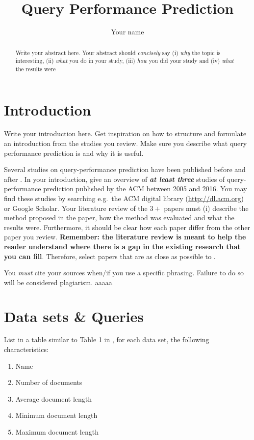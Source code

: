 \documentclass{sig-alternate}
\begin{document}
\title{Query Performance Prediction}
\author{
\alignauthor 
Your name
}
\maketitle

\begin{abstract}
Write your abstract here. Your abstract should \emph{concisely} say (i) \emph{why} the topic is interesting, (ii) \emph{what} you do in your study, (iii) \emph{how} you did your study and (iv) \emph{what} the results were
\end{abstract}

\section{Introduction}
Write your introduction here. Get inspiration on how to structure and formulate an introduction from the studies you review. Make sure you describe what query performance prediction is and why it is useful.

Several studies on query-performance prediction have been published before and after \cite{cummins2011improved}. In your introduction, give an overview of \textbf{\emph{at least three}} studies of query-performance prediction published by the ACM between 2005 and 2016. You may find these studies by searching e.g.\ the ACM digital library (\url{http://dl.acm.org}) or Google Scholar. Your literature review of the $3+$ papers must (i) describe the method proposed in the paper, how the method was evaluated and what the results were. Furthermore, it should be clear how each paper differ from the other paper you review. \textbf{Remember: the literature review is meant to help the reader understand where there is a gap in the existing research that you can fill}. Therefore, select papers that are as close as possible to \cite{cummins2011improved}. 

You \emph{must} cite your sources when/if you use a specific phrasing. Failure to do so will be considered plagiarism.
aaaaa
\section{Data sets \& Queries}
List in a table similar to Table 1 in \cite{cummins2011improved}, for each data set, the following characteristics:
\begin{enumerate}
\item Name
\item Number of documents
\item Average document length
\item Minimum document length
\item Maximum document length
\end{enumerate}
\end{document}
